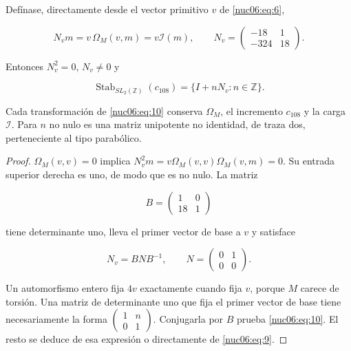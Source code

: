 \begin{theorem}

Defínase, directamente desde el vector primitivo \(v\) de \eqref{nuc06:eq:6},

\begin{equation}
N_v m=v\,\Omega_M(v,m)=v\mathcal I(m),\qquad
N_v=\begin{pmatrix}-18&1\\-324&18\end{pmatrix}.
\label{nuc06:eq:9}
\end{equation}

Entonces \(N_v^2=0\), \(N_v\ne0\) y

\begin{equation}
\boxed{\quad
\operatorname{Stab}_{SL_2(\mathbb Z)}(c_{108})
=\{I+nN_v:n\in\mathbb Z\}.
\quad}
\label{nuc06:eq:10}
\end{equation}

Cada transformación de \eqref{nuc06:eq:10} conserva \(\Omega_M\), el incremento \(c_{108}\) y la carga \(\mathcal I\). Para \(n\) no nulo es una matriz unipotente no identidad, de traza dos, perteneciente al tipo parabólico.
\end{theorem}

\begin{proof}
\(\Omega_M(v,v)=0\) implica \(N_v^2m=v\Omega_M(v,v)\Omega_M(v,m)=0\). Su entrada superior derecha es uno, de modo que es no nulo. La matriz

\[
B=\begin{pmatrix}1&0\\18&1\end{pmatrix}
\]

tiene determinante uno, lleva el primer vector de base a \(v\) y satisface

\begin{equation}
N_v=BNB^{-1},\qquad N=\begin{pmatrix}0&1\\0&0\end{pmatrix}.
\label{nuc06:eq:11}
\end{equation}

Un automorfismo entero fija \(4v\) exactamente cuando fija \(v\), porque \(M\) carece de torsión. Una matriz de determinante uno que fija el primer vector de base tiene necesariamente la forma \(\begin{pmatrix}1&n\\0&1\end{pmatrix}\). Conjugarla por \(B\) prueba \eqref{nuc06:eq:10}. El resto se deduce de esa expresión o directamente de \eqref{nuc06:eq:9}.
\end{proof}

